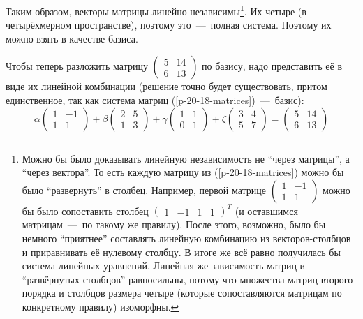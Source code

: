 \documentclass[a4paper,12pt]{article}
\begin{document}
  Таким образом, векторы-матрицы линейно независимы\footnote{
    Можно бы было доказывать линейную независимость не ``через матрицы'', а ``через вектора''.
    То есть каждую матрицу из (\ref{p-20-18-matrices}) можно бы было ``развернуть'' в столбец.
    Например, первой матрице $\left(\begin{smallmatrix} 1 & -1 \\ 1 & 1\end{smallmatrix}\right)$ можно бы было сопоставить столбец $\left(\begin{smallmatrix} 1 & -1 & 1 & 1\end{smallmatrix}\right)^T$ (и оставшимся матрицам~---~по такому же правилу).
    После этого, возможно, было бы немного ``приятнее'' составлять линейную комбинацию из векторов-столбцов и приравнивать её нулевому столбцу.
    В итоге же всё равно получилась бы система линейных уравнений.
    Линейная же зависимость матриц и ``развёрнутых столбцов'' равносильны, потому что множества матриц второго порядка и столбцов размера четыре (которые сопоставляются матрицам по конкретному правилу) изоморфны.
  }.
  Их четыре (в четырёхмерном пространстве), поэтому это~---~полная система.
  Поэтому их можно взять в качестве базиса.
  
  \bigskip
  
  Чтобы теперь разложить матрицу $\left(\begin{smallmatrix} 5 & 14\\ 6 & 13 \end{smallmatrix}\right)$ по базису, надо представить её в виде их линейной комбинации (решение точно будет существовать, притом единственное, так как система матриц (\ref{p-20-18-matrices})~---~базис):
  \[
    \alpha \begin{pmatrix}
      1 & -1\\
      1 & 1
    \end{pmatrix} + \beta \begin{pmatrix}
      2 & 5\\
      1 & 3
    \end{pmatrix} + \gamma \begin{pmatrix}
      1 & 1\\
      0 & 1
    \end{pmatrix} + \zeta \begin{pmatrix}
      3 & 4\\
      5 & 7
    \end{pmatrix} = \begin{pmatrix}
      5 & 14\\
      6 & 13
    \end{pmatrix}
  \]
  
\end{document}
